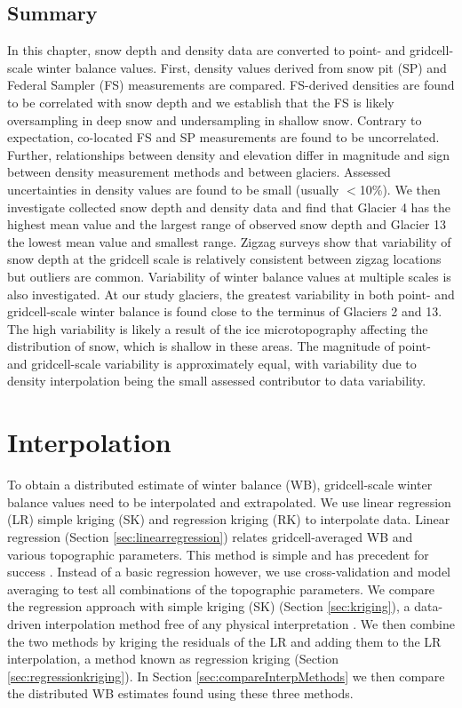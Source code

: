 \documentclass{sfuthesis}
\begin{document}
\section{Summary}

In this chapter, snow depth and density data are converted to point- and gridcell-scale winter balance values. First, density values derived from snow pit (SP) and Federal Sampler (FS) measurements are compared. FS-derived densities are found to be correlated with snow depth and we establish that the FS is likely oversampling in deep snow and undersampling in shallow snow. Contrary to expectation, co-located FS and SP measurements are found to be  uncorrelated. Further, relationships between density and elevation differ in magnitude and sign between density measurement methods and between glaciers. Assessed uncertainties in density values are found to be small (usually $<$10\%). We then investigate collected snow depth and density data and find that Glacier 4 has the highest mean value and the largest range of observed snow depth and Glacier 13 the lowest mean value and smallest range. Zigzag surveys show that variability of snow depth at the gridcell scale is relatively consistent between zigzag locations but outliers are common. Variability of winter balance values at multiple scales is also investigated. At our study glaciers, the greatest variability in both point- and gridcell-scale winter balance is found close to the terminus of Glaciers 2 and 13. The high variability is likely a result of the ice microtopography affecting the distribution of snow, which is shallow in these areas. The magnitude of point- and gridcell-scale variability is approximately equal, with variability due to density interpolation being the small assessed contributor to data variability.


\chapter{Interpolation}

To obtain a distributed estimate of winter balance (WB), gridcell-scale winter balance values need to be interpolated and extrapolated. We use linear regression (LR) simple kriging (SK) and regression kriging (RK) to interpolate data. Linear regression (Section \ref{sec:linearregression}) relates gridcell-averaged WB and various topographic parameters. This method is simple and has precedent for success \citep[e.g.][]{McGrath2015}. Instead of a basic regression however, we use cross-validation and model averaging to test all combinations of the topographic parameters. We compare the regression approach with simple kriging (SK) (Section \ref{sec:kriging}), a data-driven interpolation method free of any physical interpretation \citep[e.g.][]{Hock1999}. We then combine the two methods by kriging the residuals of the LR and adding them to the LR interpolation, a method known as regression kriging (Section \ref{sec:regressionkriging}). In Section \ref{sec:compareInterpMethods} we then compare the distributed WB estimates found using these three methods.
\end{document}
